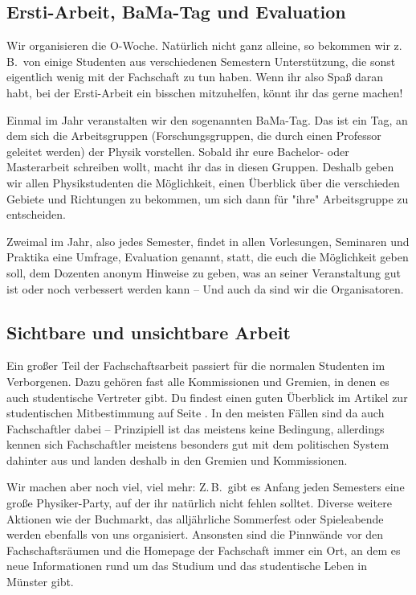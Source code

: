 \begin{multicols}{2}
\subsection*{Ersti-Arbeit, BaMa-Tag und Evaluation}
Wir organisieren die O-Woche. Natürlich nicht ganz alleine, so bekommen wir z.\,B.\ von einige Studenten aus verschiedenen Semestern Unterstützung, die sonst eigentlich wenig mit der Fachschaft zu tun haben. Wenn ihr also Spaß daran habt, bei der Ersti-Arbeit ein bisschen mitzuhelfen, könnt ihr das gerne machen!


Einmal im Jahr veranstalten wir den sogenannten BaMa-Tag. Das ist ein Tag, an dem sich die Arbeitsgruppen (Forschungsgruppen, die durch einen Professor geleitet werden) der Physik vorstellen. Sobald ihr eure Bachelor- oder Masterarbeit schreiben wollt, macht ihr das in diesen Gruppen. Deshalb geben wir allen Physikstudenten die Möglichkeit, einen Überblick über die verschieden Gebiete und Richtungen zu bekommen, um sich dann für "ihre" Arbeitsgruppe zu entscheiden.

Zweimal im Jahr, also jedes Semester, findet in allen Vorlesungen, Seminaren und Praktika eine Umfrage, Evaluation genannt, statt, die euch die Möglichkeit geben soll, dem Dozenten anonym Hinweise zu geben, was an seiner Veranstaltung gut ist oder noch verbessert werden kann -- Und auch da sind wir die Organisatoren.

\subsection*{Sichtbare und unsichtbare Arbeit}
Ein großer Teil der Fachschaftsarbeit passiert für die normalen Studenten im Verborgenen. Dazu gehören fast alle Kommissionen und Gremien, in denen es auch studentische Vertreter gibt. Du findest einen guten Überblick im Artikel zur studentischen Mitbestimmung auf Seite \pageref{studmit}.
In den meisten Fällen sind da auch Fachschaftler dabei -- Prinzipiell ist das meistens keine Bedingung, allerdings kennen sich Fachschaftler meistens besonders gut mit dem politischen System dahinter aus und landen deshalb in den Gremien und Kommissionen.

Wir machen aber noch viel, viel mehr: Z.\,B.\ gibt es Anfang jeden Semesters eine große Physiker-Party, auf der ihr natürlich nicht fehlen solltet. Diverse weitere Aktionen wie der Buchmarkt, das alljährliche Sommerfest oder Spieleabende werden ebenfalls von uns organisiert. Ansonsten sind die Pinnwände vor den Fachschaftsräumen und die Homepage der Fachschaft immer ein Ort, an dem es neue Informationen rund um das Studium und das studentische Leben in Münster gibt.


\end{multicols}
